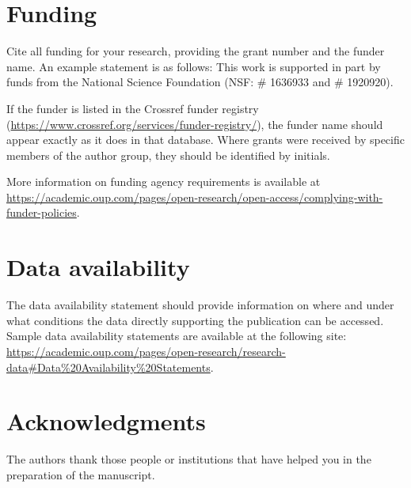 \documentclass[12pt,a4paper]{article}
\begin{document}
\section*{Funding}
Cite all funding for your research, providing the grant number and the funder name. An example statement is as follows: This work is supported in part by funds from the National Science Foundation (NSF: \# 1636933 and \# 1920920). 

If the funder is listed in the Crossref funder registry (\url{https://www.crossref.org/services/funder-registry/}), the funder name should appear exactly as it does in that database. Where grants were received by specific members of the author group, they should be identified by initials. 

More information on funding agency requirements is available at  \url{https://academic.oup.com/pages/open-research/open-access/complying-with-funder-policies}.

\section*{Data availability}
The data availability statement should provide information on where and under what conditions the data directly supporting the publication can be accessed. Sample data availability statements are available at the following site: \url{https://academic.oup.com/pages/open-research/research-data#Data%20Availability%20Statements}.

\section*{Acknowledgments}
The authors thank those people or institutions that have helped you in the preparation of the manuscript. 



\printbibliography





\renewcommand\theequation{\Alph{section}\arabic{equation}} %
\renewcommand\thefigure{\Alph{section}\arabic{figure}} %
\renewcommand\thetable{\Alph{section}\arabic{table}} %
\end{document}
